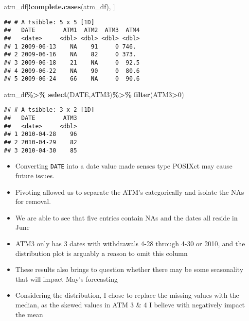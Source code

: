 \documentclass[
]{article}
\newenvironment{Shaded}{\begin{snugshade}}{\end{snugshade}}
\newcommand{\DecValTok}[1]{\textcolor[rgb]{0.00,0.00,0.81}{#1}}
\newcommand{\FunctionTok}[1]{\textcolor[rgb]{0.13,0.29,0.53}{\textbf{#1}}}
\newcommand{\NormalTok}[1]{#1}
\newcommand{\SpecialCharTok}[1]{\textcolor[rgb]{0.81,0.36,0.00}{\textbf{#1}}}
\providecommand{\tightlist}{%
  \setlength{\itemsep}{0pt}\setlength{\parskip}{0pt}}
\begin{document}
\begin{Shaded}
\begin{Highlighting}[]
\NormalTok{atm\_df[}\SpecialCharTok{!}\FunctionTok{complete.cases}\NormalTok{(atm\_df), ]}
\end{Highlighting}
\end{Shaded}

\begin{verbatim}
## # A tsibble: 5 x 5 [1D]
##   DATE        ATM1  ATM2  ATM3  ATM4
##   <date>     <dbl> <dbl> <dbl> <dbl>
## 1 2009-06-13    NA    91     0 746. 
## 2 2009-06-16    NA    82     0 373. 
## 3 2009-06-18    21    NA     0  92.5
## 4 2009-06-22    NA    90     0  80.6
## 5 2009-06-24    66    NA     0  90.6
\end{verbatim}

\begin{Shaded}
\begin{Highlighting}[]
\NormalTok{atm\_df}\SpecialCharTok{\%\textgreater{}\%}
  \FunctionTok{select}\NormalTok{(DATE,ATM3)}\SpecialCharTok{\%\textgreater{}\%}
  \FunctionTok{filter}\NormalTok{(ATM3}\SpecialCharTok{\textgreater{}}\DecValTok{0}\NormalTok{)}
\end{Highlighting}
\end{Shaded}

\begin{verbatim}
## # A tsibble: 3 x 2 [1D]
##   DATE        ATM3
##   <date>     <dbl>
## 1 2010-04-28    96
## 2 2010-04-29    82
## 3 2010-04-30    85
\end{verbatim}

\begin{itemize}
\tightlist
\item
  Converting \texttt{DATE} into a date value made senses type POSIXct
  may cause future issues.
\item
  Pivoting allowed us to separate the ATM's categorically and isolate
  the NAs for removal.
\item
  We are able to see that five entries contain NAs and the dates all
  reside in June
\item
  ATM3 only has 3 dates with withdrawals 4-28 through 4-30 or 2010, and
  the distribution plot is arguably a reason to omit this column
\item
  These results also brings to question whether there may be some
  seasonality that will impact May's forecasting
\item
  Considering the distribution, I chose to replace the missing values
  with the median, as the skewed values in ATM 3 \& 4 I believe with
  negatively impact the mean
\end{itemize}
\end{document}
